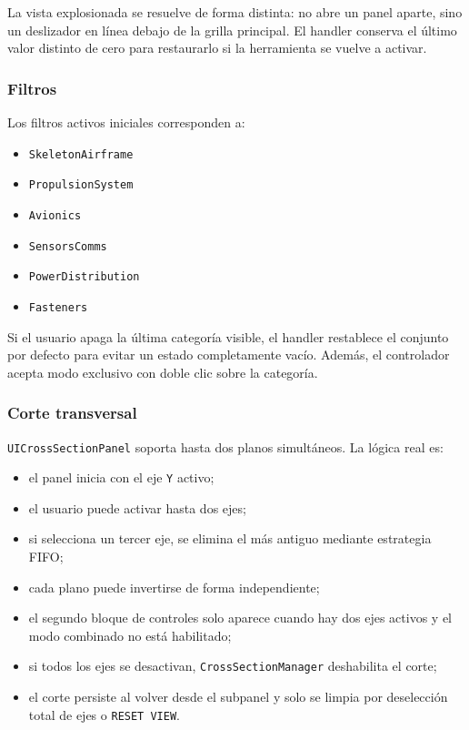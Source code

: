 \documentclass[12pt,letterpaper]{article}
\begin{document}
\noindent La vista explosionada se resuelve de forma distinta: no abre un panel aparte, sino un deslizador en línea debajo de la grilla principal. El handler conserva el último valor distinto de cero para restaurarlo si la herramienta se vuelve a activar.

\subsubsection{Filtros}
Los filtros activos iniciales corresponden a:
\begin{itemize}
    \item \texttt{SkeletonAirframe}
    \item \texttt{PropulsionSystem}
    \item \texttt{Avionics}
    \item \texttt{SensorsComms}
    \item \texttt{PowerDistribution}
    \item \texttt{Fasteners}
\end{itemize}

\noindent Si el usuario apaga la última categoría visible, el handler restablece el conjunto por defecto para evitar un estado completamente vacío. Además, el controlador acepta modo exclusivo con doble clic sobre la categoría.

\subsubsection{Corte transversal}
\texttt{UICrossSectionPanel} soporta hasta dos planos simultáneos. La lógica real es:
\begin{itemize}
    \item el panel inicia con el eje \texttt{Y} activo;
    \item el usuario puede activar hasta dos ejes;
    \item si selecciona un tercer eje, se elimina el más antiguo mediante estrategia FIFO;
    \item cada plano puede invertirse de forma independiente;
    \item el segundo bloque de controles solo aparece cuando hay dos ejes activos y el modo combinado no está habilitado;
    \item si todos los ejes se desactivan, \texttt{CrossSectionManager} deshabilita el corte;
    \item el corte persiste al volver desde el subpanel y solo se limpia por deselección total de ejes o \texttt{RESET VIEW}.
\end{itemize}
\end{document}
